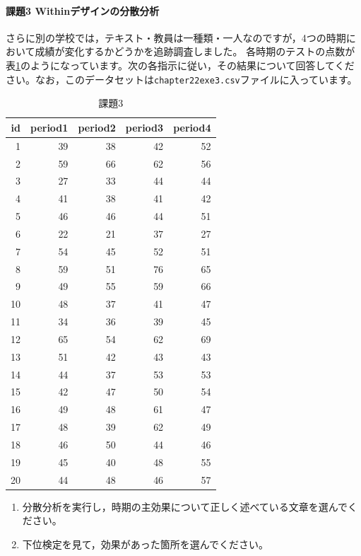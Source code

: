 \documentclass{ltjsarticle}
\begin{document}
\paragraph{課題3 Withinデザインの分散分析}
さらに別の学校では，テキスト・教員は一種類・一人なのですが，4つの時期において成績が変化するかどうかを追跡調査しました。
各時期のテストの点数が表\ref{L23::exe3}のようになっています。次の各指示に従い，その結果について回答してください。なお，このデータセットは\texttt{chapter22exe3.csv}ファイルに入っています。

\begin{table}[ht]
  \centering
  \caption{課題3}
\begin{tabular}{r|rrrr}
  \hline
  id & period1 & period2 & period3 & period4\\
  \hline
  1 & 39 & 38 & 42 & 52\\
  2 & 59 & 66 & 62 & 56\\
  3 & 27 & 33 & 44 & 44\\
  4 & 41 & 38 & 41 & 42\\
  5 & 46 & 46 & 44 & 51\\
  6 & 22 & 21 & 37 & 27\\
  7 & 54 & 45 & 52 & 51\\
  8 & 59 & 51 & 76 & 65\\
  9 & 49 & 55 & 59 & 66\\
  10 & 48 & 37 & 41 & 47\\
  11 & 34 & 36 & 39 & 45\\
  12 & 65 & 54 & 62 & 69\\
  13 & 51 & 42 & 43 & 43\\
  14 & 44 & 37 & 53 & 53\\
  15 & 42 & 47 & 50 & 54\\
  16 & 49 & 48 & 61 & 47\\
  17 & 48 & 39 & 62 & 49\\
  18 & 46 & 50 & 44 & 46\\
  19 & 45 & 40 & 48 & 55\\
  20 & 44 & 48 & 46 & 57\\
  \hline
  \end{tabular}
  \label{L23::exe3}
\end{table}

\begin{enumerate}
  \item 分散分析を実行し，時期の主効果について正しく述べている文章を選んでください。
  \item 下位検定を見て，効果があった箇所を選んでください。
\end{enumerate}
\end{document}
